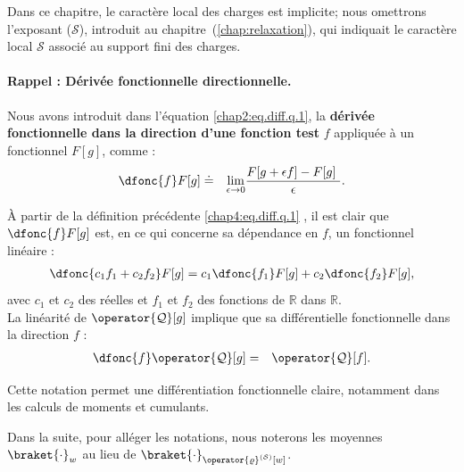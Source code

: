 \medskip

Dans ce chapitre, le caractère local des charges est implicite; nous omettrons l’exposant ($\mathcal{S}$), introduit au chapitre~(\ref{chap:relaxation}), qui indiquait le caractère local $\mathcal{S}$ associé au support fini des charges.

\medskip


\begin{mdframed}[
	linewidth=0.5pt, 
	backgroundcolor=gray!5, 
	roundcorner=50pt,	
	innerleftmargin=5pt,
    innerrightmargin=5pt,
    innertopmargin=-10pt,
    innerbottommargin=2pt,
    leftmargin=2pt,
    rightmargin=2pt
	]
\paragraph{Rappel : Dérivée fonctionnelle directionnelle.}
Nous avons introduit dans l'équation \eqref{chap2:eq.diff.q.1},  la {\bf dérivée fonctionnelle dans la direction d’une fonction test} $f$ appliquée à un fonctionnel $F[g]$, comme :
\begin{eqnarray}\label{chap4:eq.diff.q.1}
	\dfonc{f} F[g] & \doteq &  \underset{\epsilon \to 0 }{ \lim  } \frac{ F[g + \epsilon f ]  - F [ g] }{\epsilon} .	
\end{eqnarray}
\end{mdframed}

À partir de la définition précédente \eqref{chap4:eq.diff.q.1} , il est clair que $\dfonc{f} F[g]$ est, en ce qui concerne sa dépendance en $f$, un fonctionnel linéaire :
\begin{eqnarray}\label{chap4:eq.diff.lin.q.1}
	\dfonc{c_1f_1 + c_2 f_2}F[g] = c_1 \dfonc{f_1}F[g] + c_2 \dfonc{f_2}F[g],
\end{eqnarray}
avec $c_1$ et $c_2$ des réelles et $f_1$ et $f_2$ des fonctions de $\mathbb{R}$ dans $\mathbb{R}$.\\

La linéarité de $\operator{\mathcal{Q}}[g]$ implique que sa différentielle fonctionnelle dans la direction $f$ :
\begin{eqnarray}
	\dfonc{f} \operator{\mathcal{Q}}[g] & =  & \operator{\mathcal{Q}}[f] .	
\end{eqnarray}

\medskip

Cette notation permet une différentiation fonctionnelle claire, notamment dans les calculs de moments et cumulants.

\medskip

Dans la suite, pour alléger les notations, nous noterons les moyennes $\braket{\cdot}_{w}$ au lieu de $\braket{\cdot}_{\operator{\varrho}^{(\mathcal{S})}[w]}$.

